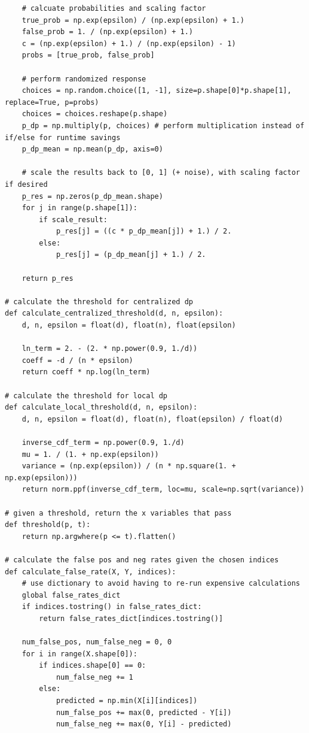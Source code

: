 \documentclass[12pt]{article}
\begin{document}
\begin{appendices}
\begin{lstlisting}
    # calcuate probabilities and scaling factor
    true_prob = np.exp(epsilon) / (np.exp(epsilon) + 1.)
    false_prob = 1. / (np.exp(epsilon) + 1.)
    c = (np.exp(epsilon) + 1.) / (np.exp(epsilon) - 1)
    probs = [true_prob, false_prob]

    # perform randomized response
    choices = np.random.choice([1, -1], size=p.shape[0]*p.shape[1], replace=True, p=probs)
    choices = choices.reshape(p.shape)
    p_dp = np.multiply(p, choices) # perform multiplication instead of if/else for runtime savings
    p_dp_mean = np.mean(p_dp, axis=0)

    # scale the results back to [0, 1] (+ noise), with scaling factor if desired
    p_res = np.zeros(p_dp_mean.shape)
    for j in range(p.shape[1]):
        if scale_result:
            p_res[j] = ((c * p_dp_mean[j]) + 1.) / 2.
        else:
            p_res[j] = (p_dp_mean[j] + 1.) / 2.

    return p_res

# calculate the threshold for centralized dp
def calculate_centralized_threshold(d, n, epsilon):
    d, n, epsilon = float(d), float(n), float(epsilon)

    ln_term = 2. - (2. * np.power(0.9, 1./d))
    coeff = -d / (n * epsilon)
    return coeff * np.log(ln_term)

# calculate the threshold for local dp
def calculate_local_threshold(d, n, epsilon):
    d, n, epsilon = float(d), float(n), float(epsilon) / float(d)

    inverse_cdf_term = np.power(0.9, 1./d)
    mu = 1. / (1. + np.exp(epsilon))
    variance = (np.exp(epsilon)) / (n * np.square(1. + np.exp(epsilon)))
    return norm.ppf(inverse_cdf_term, loc=mu, scale=np.sqrt(variance))

# given a threshold, return the x variables that pass
def threshold(p, t):
    return np.argwhere(p <= t).flatten()

# calculate the false pos and neg rates given the chosen indices
def calculate_false_rate(X, Y, indices):
    # use dictionary to avoid having to re-run expensive calculations
    global false_rates_dict
    if indices.tostring() in false_rates_dict:
        return false_rates_dict[indices.tostring()]

    num_false_pos, num_false_neg = 0, 0
    for i in range(X.shape[0]):
        if indices.shape[0] == 0:
            num_false_neg += 1
        else:
            predicted = np.min(X[i][indices])
            num_false_pos += max(0, predicted - Y[i])
            num_false_neg += max(0, Y[i] - predicted)


\end{lstlisting}
\end{appendices}
\end{document}
